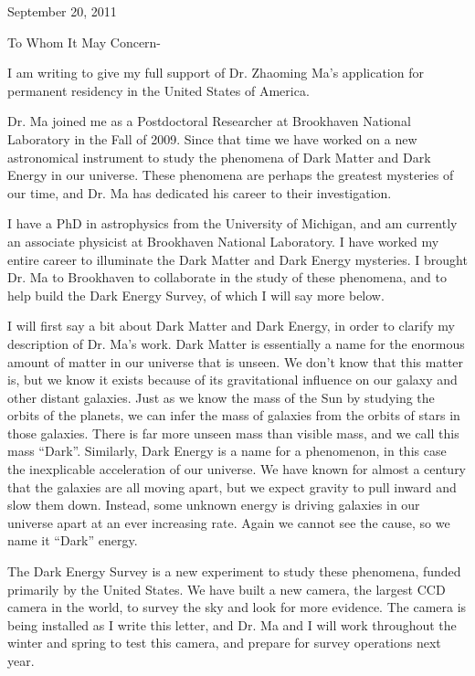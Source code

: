 \documentclass[12pt]{letter}
\begin{document}
\hfill September 20,  2011
\newline

To Whom It May Concern-

I am writing to give my full support of Dr. Zhaoming Ma's application for
permanent residency in the United States of America.

Dr. Ma joined me as a Postdoctoral Researcher at Brookhaven National Laboratory
in the Fall of 2009.  Since that time we have worked on a new astronomical
instrument to study the phenomena of Dark Matter and Dark Energy in our
universe.  These phenomena are perhaps the greatest mysteries of our time, and
Dr. Ma has dedicated his career to their investigation.

I have a PhD in astrophysics from the University of Michigan, and am currently
an associate physicist at Brookhaven National Laboratory.  I have worked my
entire career to illuminate the Dark Matter and Dark Energy mysteries.  I
brought Dr. Ma to Brookhaven to collaborate in the study of these phenomena,
and to help build the Dark Energy Survey, of which I will say more below.

I will first say a bit about Dark Matter and Dark Energy, in order to clarify
my description of Dr. Ma's work.  Dark Matter is essentially a name for the
enormous amount of matter in our universe that is unseen.  We don't know that
this matter is, but we know it exists because of its gravitational influence on
our galaxy and other distant galaxies.  Just as we know the mass of the Sun by
studying the orbits of the planets, we can infer the mass of galaxies from the
orbits of stars in those galaxies.  There is far more unseen mass than visible
mass, and we call this mass ``Dark''.  Similarly, Dark Energy is a name for a
phenomenon, in this case the inexplicable acceleration of our universe. We have
known for almost a century that the galaxies are all moving apart, but we
expect gravity to pull inward and slow them down.  Instead, some unknown energy
is driving galaxies in our universe apart at an ever increasing rate.  Again
we cannot see the cause, so we name it ``Dark'' energy.

The Dark Energy Survey is a new experiment to study these phenomena, funded
primarily by the United States.  We have built a new camera, the largest CCD
camera in the world, to survey the sky and look for more evidence.  The camera
is being installed as I write this letter, and Dr. Ma and I will work
throughout the winter and spring to test this camera, and prepare for survey
operations next year.
\end{document}
